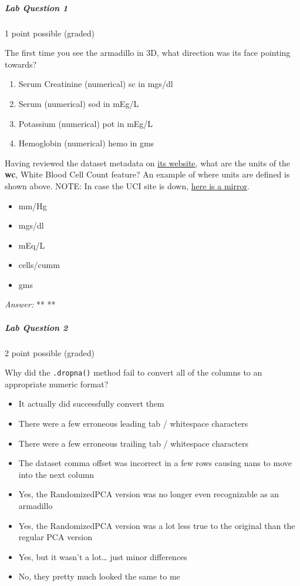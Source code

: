 \documentclass[11pt]{article}
\providecommand{\tightlist}{%
      \setlength{\itemsep}{0pt}\setlength{\parskip}{0pt}}
\begin{document}
\hypertarget{lab-question-1-1}{%
\subparagraph{Lab Question 1}\label{lab-question-1-1}}

1 point possible (graded)

The first time you see the armadillo in 3D, what direction was its face
pointing towards?

\begin{enumerate}
\def\labelenumi{\arabic{enumi}.}
\setcounter{enumi}{11}
\tightlist
\item
  Serum Creatinine (numerical) sc in mgs/dl
\item
  Serum (numerical) sod in mEg/L
\item
  Potassium (numerical) pot in mEg/L
\item
  Hemoglobin (numerical) hemo in gms
\end{enumerate}

Having reviewed the dataset metadata on
\href{https://archive.ics.uci.edu/ml/datasets/Chronic_Kidney_Disease}{its
website}, what are the units of the \textbf{wc}, White Blood Cell Count
feature? An example of where units are defined is shown above. NOTE: In
case the UCI site is down,
\href{http://mlr.cs.umass.edu/ml/datasets/Chronic_Kidney_Disease}{here
is a mirror}.

\begin{itemize}
\tightlist
\item
  mm/Hg
\item
  mgs/dl
\item
  mEq/L
\item
  cells/cumm
\item
  gms
\end{itemize}

\emph{Answer:} ** **

\hypertarget{lab-question-2}{%
\subparagraph{Lab Question 2}\label{lab-question-2}}

2 point possible (graded)

Why did the \texttt{.dropna()} method fail to convert all of the columns
to an appropriate numeric format?

\begin{itemize}
\item
  It actually did successfully convert them
\item
  There were a few erroneous leading tab / whitespace characters
\item
  There were a few erroneous trailing tab / whitespace characters
\item
  The dataset comma offset was incorrect in a few rows causing nans to
  move into the next column
\item
  Yes, the RandomizedPCA version was no longer even recognizable as an
  armadillo
\item
  Yes, the RandomizedPCA version was a lot less true to the original
  than the regular PCA version
\item
  Yes, but it wasn't a lot\ldots{} just minor differences
\item
  No, they pretty much looked the same to me
\end{itemize}
\end{document}
